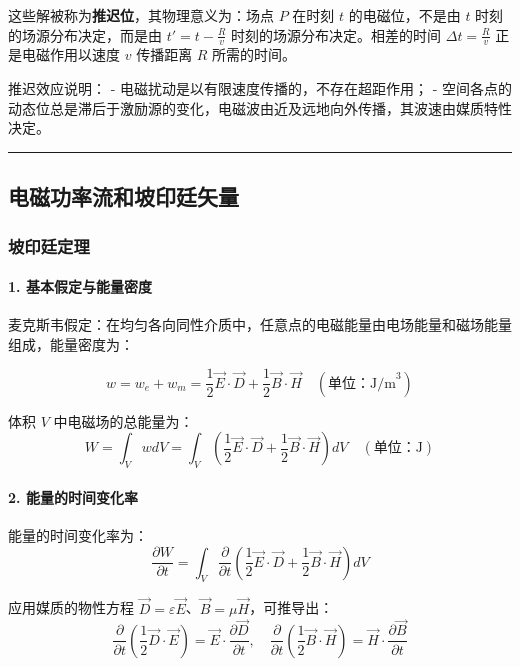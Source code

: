 这些解被称为\textbf{推迟位}，其物理意义为：场点 $P$ 在时刻 $t$ 的电磁位，不是由 $t$ 时刻的场源分布决定，而是由 $t' = t - \frac{R}{v}$ 时刻的场源分布决定。相差的时间 $\Delta t = \frac{R}{v}$ 正是电磁作用以速度 $v$ 传播距离 $R$ 所需的时间。

推迟效应说明：
- 电磁扰动是以有限速度传播的，不存在超距作用；
- 空间各点的动态位总是滞后于激励源的变化，电磁波由近及远地向外传播，其波速由媒质特性决定。

\vspace{0.8cm}\hrule\vspace{0.8cm}

\subsection{电磁功率流和坡印廷矢量}
\subsubsection{坡印廷定理}
\paragraph{1. 基本假定与能量密度}
麦克斯韦假定：在均匀各向同性介质中，任意点的电磁能量由电场能量和磁场能量组成，能量密度为：
\begin{formulaBox}
\[
w = w_e + w_m = \frac{1}{2} \vec{E} \cdot \vec{D} + \frac{1}{2} \vec{B} \cdot \vec{H} \quad (\text{单位：J/m}^3)
\]
\end{formulaBox}

体积 $V$ 中电磁场的总能量为：
\[
W = \int_{V} w dV = \int_{V} \left( \frac{1}{2} \vec{E} \cdot \vec{D} + \frac{1}{2} \vec{B} \cdot \vec{H} \right) dV \quad (\text{单位：J})
\]

\paragraph{2. 能量的时间变化率}
能量的时间变化率为：
\[
\frac{\partial W}{\partial t} = \int_{V} \frac{\partial}{\partial t} \left( \frac{1}{2} \vec{E} \cdot \vec{D} + \frac{1}{2} \vec{B} \cdot \vec{H} \right) dV
\]

应用媒质的物性方程 $\vec{D} = \varepsilon \vec{E}$、$\vec{B} = \mu \vec{H}$，可推导出：
\[
\frac{\partial}{\partial t} \left( \frac{1}{2} \vec{D} \cdot \vec{E} \right) = \vec{E} \cdot \frac{\partial \vec{D}}{\partial t}, \quad
\frac{\partial}{\partial t} \left( \frac{1}{2} \vec{B} \cdot \vec{H} \right) = \vec{H} \cdot \frac{\partial \vec{B}}{\partial t}
\]

